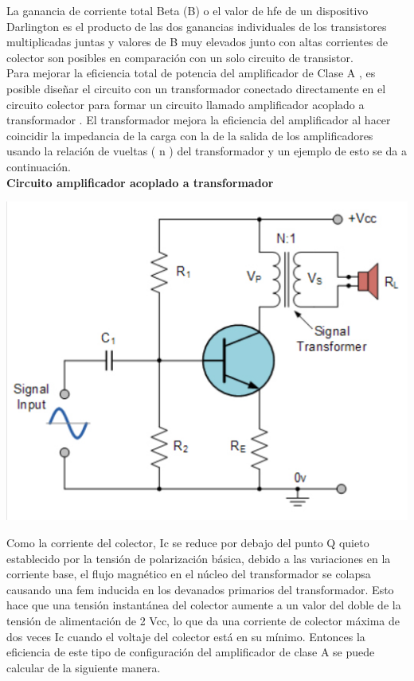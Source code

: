 \documentclass[10pt,a4paper]{article}
\begin{document}
La ganancia de corriente total Beta (B) o el valor de hfe de un dispositivo Darlington es el producto de las dos ganancias individuales de los transistores multiplicadas juntas y valores de B muy elevados junto con altas corrientes de colector son posibles en comparación con un solo circuito de transistor.\\
Para mejorar la eficiencia total de potencia del amplificador de Clase A , es posible diseñar el circuito con un transformador conectado directamente en el circuito colector para formar un circuito llamado amplificador acoplado a transformador . El transformador mejora la eficiencia del amplificador al hacer coincidir la impedancia de la carga con la de la salida de los amplificadores usando la relación de vueltas ( n ) del transformador y un ejemplo de esto se da a continuación.\\
\textbf{Circuito amplificador acoplado a transformador}\\
\begin{center}
\includegraphics[scale=0.4]{img4.png} 
\end{center}
Como la corriente del colector, Ic se reduce por debajo del punto Q quieto establecido por la tensión de polarización básica, debido a las variaciones en la corriente base, el flujo magnético en el núcleo del transformador se colapsa causando una fem inducida en los devanados primarios del transformador. Esto hace que una tensión instantánea del colector aumente a un valor del doble de la tensión de alimentación de 2 Vcc, lo que da una corriente de colector máxima de dos veces Ic cuando el voltaje del colector está en su mínimo. Entonces la eficiencia de este tipo de configuración del amplificador de clase A se puede calcular de la siguiente manera.\\
\end{document}
